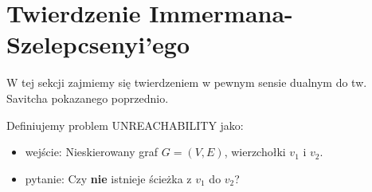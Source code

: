 \section{Twierdzenie Immermana-Szelepcsenyi'ego}

W tej sekcji zajmiemy się twierdzeniem w pewnym sensie dualnym do tw. Savitcha pokazanego poprzednio.

\begin{definition}
    Definiujemy problem \textsc{UNREACHABILITY} jako:
    \begin{itemize}
        \item wejście: Nieskierowany graf \( G = (V, E) \), wierzchołki \(v_1\) i \(v_2\).
        \item pytanie: Czy \textbf{nie} istnieje ścieżka z \(v_1\) do \(v_2\)? 
    \end{itemize}
\end{definition}

